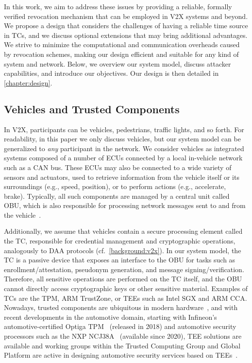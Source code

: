 In this work, we aim to
address these issues by providing a reliable, formally verified revocation
mechanism that can be employed in \ac{V2X} systems and beyond. We propose a
design that considers the challenges of having a reliable time source in
\acp{TC}, and we discuss optional extensions that may bring additional
advantages. We strive to minimize the computational and communication overheads
caused by revocation schemes, making our design efficient and suitable for any
kind of system and network. Below, we overview our system model, discuss
attacker capabilities, and introduce our objectives. Our design
is then detailed in \cref{chapter:design}.

\subsection{Vehicles and Trusted Components}
\label{section:trusted-component}

In \ac{V2X}, participants can be vehicles, pedestrians, traffic lights, and so
forth. For readability, in this paper we only discuss vehicles, but our system
model can be generalized to \emph{any} participant in the network. We consider
vehicles as integrated systems composed of a number of \acp{ECU} connected by a
local in-vehicle network such as a CAN bus. These \acp{ECU} may also be
connected to a wide variety of sensors and actuators, used to retrieve
information from the vehicle itself or its surroundings (e.g., speed, position),
or to perform actions (e.g., accelerate, brake). Typically, all such components
are managed by a central unit called \ac{OBU}, which is also responsible for
processing network messages sent to and from the
vehicle~\cite{liu2017invehicle}.

Additionally, we assume that vehicles contain a secure processing element called
the \acf{TC}, responsible for credential management and cryptographic
operations, analogously to \ac{DAA} protocols (cf.~\cref{background:v2x}). In
our system model, the \ac{TC} is a passive device that exposes an interface to
the \ac{OBU} for tasks such as enrollment/attestation, pseudonym generation, and
message signing/verification. Therefore, all sensitive operations are performed
on the \ac{TC} itself, and the \ac{OBU} cannot directly access cryptographic
keys or other sensitive material. Examples of \acp{TC} are the \ac{TPM}, ARM
TrustZone, or \acp{TEE} such as Intel \ac{SGX} and ARM \ac{CCA}. Nowadays,
trusted components are ubiquitous in modern hardware~\cite{schneider2022sok},
and with recent developments in the automotive domain, starting with Infineon's
automotive-certified Optiga TPM~\cite{optigaTPM} (released in 2018) and
automotive security processors such as the NXP NCJ38A~\cite{NXPsecureElement}
(available since 2020), \ac{TEE} solutions are available and working groups
within the Trusted Computing Group and Global Platform are active in designing
automotive security services based on
\acp{TEE}~\cite{TCG,GlobalPlatformAutomotive}.

